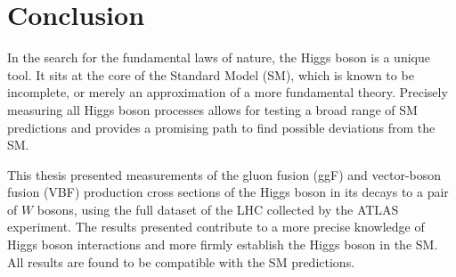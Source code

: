 \chapter{Conclusion}
\label{chap:conclusion}
In the search for the fundamental laws of nature, the Higgs boson is a unique tool. 
It sits at the core of the Standard Model (SM), which is known to be incomplete, or merely an approximation of a more fundamental theory. 
Precisely measuring all Higgs boson processes allows for testing a broad range of SM predictions and provides a promising path to find possible deviations from the SM. 

This thesis presented measurements of the gluon fusion (ggF) and vector-boson fusion (VBF) production cross sections of the Higgs boson in its decays to a pair of $W$ bosons, using the full \RunTwo dataset of the LHC collected by the ATLAS experiment. 
The results presented contribute to a more precise knowledge of Higgs boson interactions and more firmly establish the Higgs boson in the SM. All results are found to be compatible with the SM predictions. 

